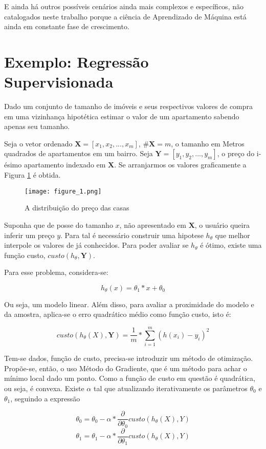 E ainda há outros possíveis cenários ainda mais complexos e específicos, não catalogados neste trabalho porque a ciência de Aprendizado de Máquina está ainda em constante fase de crescimento.

\section{Exemplo: Regressão Supervisionada}

Dado um conjunto de tamanho de imóveis e seus respectivos valores de compra em uma vizinhança hipotética estimar o valor de um apartamento sabendo apenas seu tamanho.

Seja o vetor ordenado \(\mathbf{X} = [x_{1},x_{2},...,x_{m}]\), \(\#\mathbf{X} = m\), o tamanho em Metros quadrados de apartamentos em um bairro. Seja \(\mathbf{Y} = [y_{1},y_{2},...,y_{m}]\), o preço do i-ésimo apartamento indexado em \(\mathbf{X}\). Se arranjarmos os valores graficamente a Figura \ref{fig:casas} é obtida.

\begin{figure}
	\centering
		\texttt{[image: figure\_1.png]}
		\caption{A distribuição do preço das casas}
		\label{fig:casas}
\end{figure}

Suponha que de posse do tamanho \(x\), não apresentado em \(\mathbf{X}\), o usuário queira inferir um preço \(y\). Para tal é necessário construir uma hipotese \(h_{\theta}\) que melhor interpole os valores de já conhecidos. Para poder avaliar se \(h_{\theta}\) é ótimo, existe uma função custo, \(custo(h_{\theta},\mathbf{Y})\).

Para esse problema, considera-se:

\[h_{\theta}(x) = \theta_{1}*x + \theta_{0}\]

Ou seja, um modelo linear. Além disso, para avaliar a proximidade do modelo e da amostra, aplica-se o erro quadrático médio como função custo, isto é:

\[custo(h_{\theta}(X),\mathbf{Y}) = \frac{1}{m}*\sum_{i=1}^{m}(h(x_{i})-y_{i})^2\]

Tem-se dados, função de custo, precisa-se introduzir um método de otimização. Propõe-se, então, o uso Método do Gradiente, que é um método para achar o mínimo local dado um ponto. Como a função de custo em questão é quadrática, ou seja, é convexa. Existe \(\alpha\) tal que atualizando iterativamente os parâmetros \(\theta_{0}\) e \(\theta_{1}\), seguindo a expressão

\[\theta_{0} = \theta_{0} - \alpha * \frac{\partial}{\partial \theta_{0}}  custo(h_{\theta}(X),Y)\]
\[\theta_{1} = \theta_{1} - \alpha * \frac{\partial}{\partial \theta_{1}}  custo(h_{\theta}(X),Y)\]

